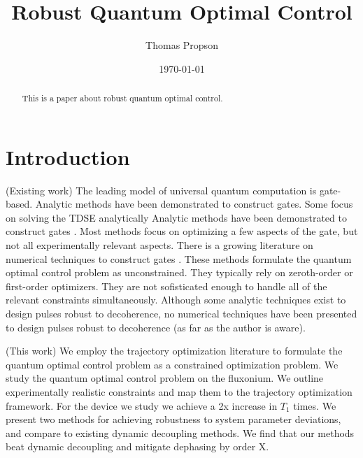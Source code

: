 \documentclass[
  amsfonts,
  amsmath,
  tbtags,
  amssymb,
  aps,
  nobibnotes,
  prl,
  twocolumn,
]{revtex4-2}
\begin{document}
\title{Robust Quantum Optimal Control}

\author{Thomas Propson}

\date{\today}


\begin{abstract}
  This is a paper about robust quantum optimal control.
\end{abstract}

\maketitle


\section{Introduction}
(Existing work) The leading model of universal
quantum computation is gate-based. Analytic methods
have been demonstrated to construct gates.
Some focus on solving the TDSE analytically
\cite{}Analytic methods have
been demonstrated to construct gates
\cite{zhang2020universal, huang2020engineering,
  han2020experimental, xu2020nonadiabatic}.
Most methods focus on optimizing a few aspects of the gate, but not all
experimentally relevant aspects. There is a growing literature
on numerical
techniques to construct gates \cite{leung2017speedup,
  goerz2019krotov, doria2011optimal, abdelhafez2019gradient,
  machnes2015gradient}.
These methods formulate the quantum optimal
control problem as unconstrained.
They typically rely on zeroth-order or first-order optimizers.
They are not
sofisticated enough to handle all of the relevant
constraints simultaneously.
Although some analytic techniques exist to design pulses robust
to decoherence, no numerical techniques have been presented to
design pulses robust to decoherence (as far as the author is aware).

(This work) We employ the trajectory optimization
literature to formulate the quantum
optimal control problem as a constrained optimization problem.
We study the quantum optimal control problem on the fluxonium.
We outline experimentally realistic constraints and map them to
the trajectory optimization framework. For the device we study
we achieve a 2x increase in $T_{1}$ times.
We present two methods for achieving robustness to system parameter deviations,
and compare to existing dynamic decoupling methods. We find that 
our methods beat dynamic decoupling and mitigate dephasing by order X.
\end{document}
